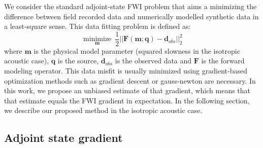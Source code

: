 \documentclass[]{segabs}
\begin{document}
We consider the standard adjoint-state FWI problem that aims a
minimizing the difference between field recorded data and numerically
modelled synthetic data in a least-square sense\citep[\citet{tarantola},
\citet{virieux}, \citet{louboutin2017fwi},
\citet{louboutin2017fwip2}]{lionsjl1971}. This data fitting problem is
defined as:
%
\begin{equation}
\underset{\mathbf{m}}{\operatorname{minimize}} \ \frac{1}{2} ||\mathbf{F}(\mathbf{m}; \mathbf{q}) - \mathbf{d}_{obs} ||_2^2
\label{adj}
\end{equation}
%
 where $\mathbf{m}$ is the physical model parameter (squared slowness in
the isotropic acoustic case), $\mathbf{q}$ is the source,
$\mathbf{d}_{obs}$ is the observed data and $\mathbf{F}$ is the forward
modeling operator. This data misfit is usually minimized using
gradient-based optimization methods such as gradient descent
\citep{plessixasfwi} or gauss-newton \citep{li2015GEOPmgn} are
necessary. In this work, we propose an unbiased estimate of that
gradient, which means that that estimate equals the FWI gradient in
expectation. In the following section, we describe our proposed method
in the isotropic acoustic case.

\subsection{Adjoint state gradient}\label{adjoint-state-gradient}
\end{document}
